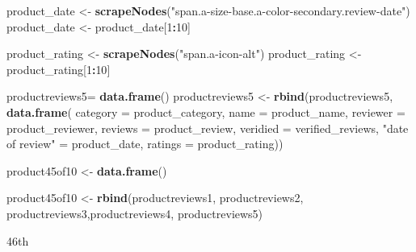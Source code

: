 \documentclass[
]{article}
\newenvironment{Shaded}{\begin{snugshade}}{\end{snugshade}}
\newcommand{\AttributeTok}[1]{\textcolor[rgb]{0.13,0.29,0.53}{#1}}
\newcommand{\DecValTok}[1]{\textcolor[rgb]{0.00,0.00,0.81}{#1}}
\newcommand{\FunctionTok}[1]{\textcolor[rgb]{0.13,0.29,0.53}{\textbf{#1}}}
\newcommand{\NormalTok}[1]{#1}
\newcommand{\OtherTok}[1]{\textcolor[rgb]{0.56,0.35,0.01}{#1}}
\newcommand{\SpecialCharTok}[1]{\textcolor[rgb]{0.81,0.36,0.00}{\textbf{#1}}}
\newcommand{\StringTok}[1]{\textcolor[rgb]{0.31,0.60,0.02}{#1}}
\begin{document}
\begin{Shaded}
\begin{Highlighting}[]
\NormalTok{  product\_date }\OtherTok{\textless{}{-}} \FunctionTok{scrapeNodes}\NormalTok{(}\StringTok{"span.a{-}size{-}base.a{-}color{-}secondary.review{-}date"}\NormalTok{)}
\NormalTok{  product\_date }\OtherTok{\textless{}{-}}\NormalTok{ product\_date[}\DecValTok{1}\SpecialCharTok{:}\DecValTok{10}\NormalTok{]}
  
\NormalTok{  product\_rating }\OtherTok{\textless{}{-}} \FunctionTok{scrapeNodes}\NormalTok{(}\StringTok{"span.a{-}icon{-}alt"}\NormalTok{)}
\NormalTok{  product\_rating }\OtherTok{\textless{}{-}}\NormalTok{ product\_rating[}\DecValTok{1}\SpecialCharTok{:}\DecValTok{10}\NormalTok{]}
  
\NormalTok{  productreviews5}\OtherTok{=} \FunctionTok{data.frame}\NormalTok{()}
\NormalTok{  productreviews5 }\OtherTok{\textless{}{-}} \FunctionTok{rbind}\NormalTok{(productreviews5, }\FunctionTok{data.frame}\NormalTok{(}
                      \AttributeTok{category =}\NormalTok{ product\_category,}
                      \AttributeTok{name =}\NormalTok{ product\_name,}
                      \AttributeTok{reviewer =}\NormalTok{ product\_reviewer,}
                      \AttributeTok{reviews =}\NormalTok{ product\_review,}
                      \AttributeTok{veridied =}\NormalTok{ verified\_reviews,}
                      \StringTok{"date of review"} \OtherTok{=}\NormalTok{ product\_date,}
                      \AttributeTok{ratings =}\NormalTok{ product\_rating))}
  
\NormalTok{  product45of10 }\OtherTok{\textless{}{-}} \FunctionTok{data.frame}\NormalTok{()}
  
\NormalTok{  product45of10 }\OtherTok{\textless{}{-}} \FunctionTok{rbind}\NormalTok{(productreviews1, productreviews2, productreviews3,productreviews4, productreviews5)}
\end{Highlighting}
\end{Shaded}

46th
\end{document}

